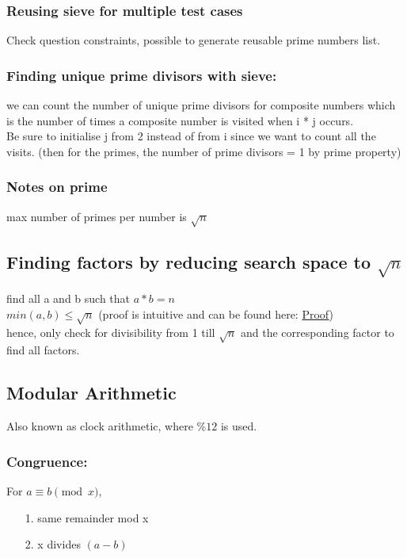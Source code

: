 \documentclass[12pt]{article}
\begin{document}
\subsubsection{Reusing sieve for multiple test cases}
Check question constraints, possible to generate reusable prime numbers list. 

\subsubsection{Finding unique prime divisors with sieve:} 
we can count the number of unique prime divisors for composite numbers which is the number of times a composite number is visited when i * j occurs. \\ 
Be sure to initialise j from 2 instead of from i since we want to count all the visits. (then for the primes, the number of prime divisors = 1 by prime property) 

\subsubsection{Notes on prime} 
max number of primes per number is \(\sqrt{n}\) 

\subsection{Finding factors by reducing search space to \(\sqrt{n}\)}
find all a and b such that \(a * b = n\) \\ 
\(min(a, b) \leq \sqrt{n}\) (proof is intuitive and can be found here: \href{https://www.codechef.com/LRNDSA05?order=desc&sortBy=successful_submissions}{Proof}) \\
hence, only check for divisibility from 1 till \(\sqrt{n}\) and the corresponding factor to find all factors. 

\subsection{Modular Arithmetic} 
Also known as clock arithmetic, where \( \% 12\) is used. 

\subsubsection{Congruence:}
For \( a \equiv b \pmod{x} \), 

\begin{itemize} 
	\item[1.] same remainder mod x
	\item[2.] x divides \((a - b)\)
\end{itemize} 
\end{document}
